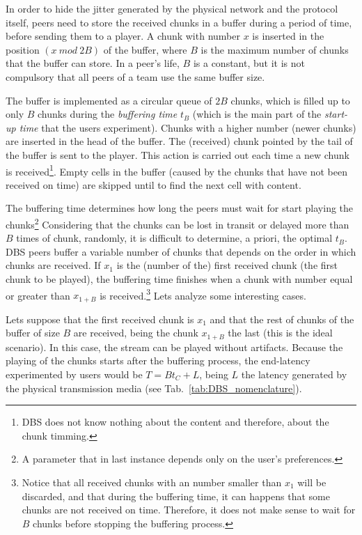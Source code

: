 
\label{sec:buffering_chunks}

In order to hide the jitter generated by the physical network and the
protocol itself, peers need to store the received chunks in a buffer
during a period of time, before sending them to a player. A chunk with
number $x$ is inserted in the position $(x~\mathit{mod}~2B)$ of the
buffer, where $B$ is the maximum number of chunks that the buffer can
store. In a peer's life, $B$ is a constant, but it is not compulsory
that all peers of a team use the same buffer size.

The buffer is implemented as a circular queue of $2B$ chunks, which is
filled up to only $B$ chunks during the \emph{buffering time} $t_B$
(which is the main part of the \emph{start-up time} that the users
experiment). Chunks with a higher number (newer chunks) are inserted
in the head of the buffer. The (received) chunk pointed by the tail of
the buffer is sent to the player. This action is carried out each time
a new chunk is received\footnote{DBS does not know nothing about the
content and therefore, about the chunk timming.}. Empty cells in the
buffer (caused by the chunks that have not been received on time) are
skipped until to find the next cell with content.

The buffering time determines how long the peers must wait for start
playing the chunks\footnote{A parameter that in last instance depends
  only on the user's preferences.} Considering that the chunks can be
lost in transit or delayed more than $B$ times of chunk, randomly, it
is difficult to determine, a priori, the optimal $t_B$. DBS peers
buffer a variable number of chunks that depends on the order in which
chunks are received. If $x_1$ is the (number of the) first received
chunk (the first chunk to be played), the buffering time finishes when
a chunk with number equal or greater than $x_{1+B}$ is
received.\footnote{Notice that all received chunks with an number
  smaller than $x_1$ will be discarded, and that during the buffering
  time, it can happens that some chunks are not received on
  time. Therefore, it does not make sense to wait for $B$ chunks
  before stopping the buffering process.} Lets analyze some
interesting cases.

Lets suppose that the first received chunk is $x_1$ and that the rest
of chunks of the buffer of size $B$ are received, being the chunk
$x_{1+B}$ the last (this is the ideal scenario). In this case, the
stream can be played without artifacts. Because the playing of the
chunks starts after the buffering process, the end-latency
experimented by users would be $T=Bt_C+L$, being $L$ the latency
generated by the physical transmission media (see
Tab.~\ref{tab:DBS_nomenclature}).

